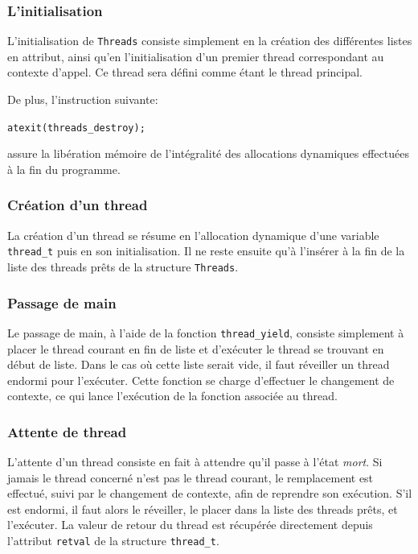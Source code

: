 \documentclass[a4paper,11pt]{article}
\begin{document}
\subsubsection*{L'initialisation}

L'initialisation de \texttt{Threads} consiste simplement en la création des différentes listes en attribut, ainsi qu'en l'initialisation d'un premier thread correspondant au contexte d'appel. Ce thread sera défini comme étant le thread principal.

De plus, l'instruction suivante:
\begin{center}
\verb[atexit(threads_destroy);[
\end{center}
assure la libération mémoire de l'intégralité des allocations dynamiques effectuées à la fin du programme.

\subsubsection*{Création d'un thread}

La création d'un thread se résume en l'allocation dynamique d'une variable \texttt{thread\_t} puis en son initialisation. Il ne reste ensuite qu'à l'insérer à la fin de la liste des threads prêts de la structure \texttt{Threads}.

\subsubsection*{Passage de main}

Le passage de main, à l'aide de la fonction \texttt{thread\_yield}, consiste simplement à placer le thread courant en fin de liste et d'exécuter le thread se trouvant en début de liste. Dans le cas où cette liste serait vide, il faut réveiller un thread endormi pour l'exécuter. Cette fonction se charge d'effectuer le changement de contexte, ce qui lance l'exécution de la fonction associée au thread.

\subsubsection*{Attente de thread}

L'attente d'un thread consiste en fait à attendre qu'il passe à l'état \textit{mort}. Si jamais le thread concerné n'est pas le thread courant, le remplacement est effectué, suivi par le changement de contexte, afin de reprendre son exécution. S'il est endormi, il faut alors le réveiller, le placer dans la liste des threads prêts, et l'exécuter. La valeur de retour du thread est récupérée directement depuis l'attribut \texttt{retval} de la structure \texttt{thread\_t}.
\end{document}
